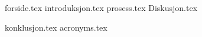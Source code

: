 \documentclass[12pt,twoside,openany, final ]{report}
\begin{document}
{forside.tex}
\setcounter{page}{0}
\listoftodos %
\tableofcontents
\setcounter{page}{0}
{introduksjon.tex}
{prosess.tex}
{Diskusjon.tex}


{konklusjon.tex}
\appendix
{acronyms.tex}

\printbibliography
\end{document}

